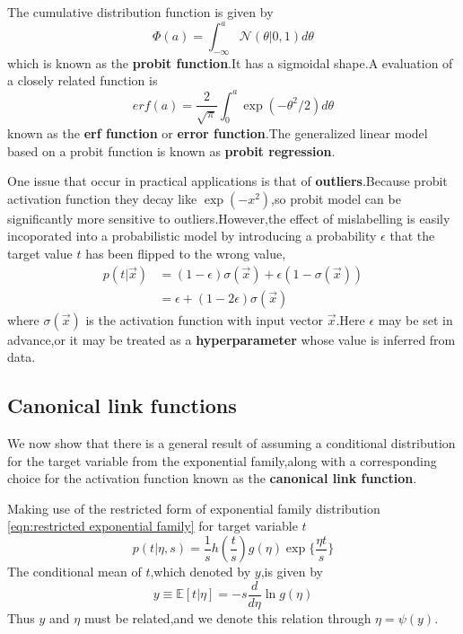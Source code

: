 The cumulative distribution function is given by
\begin{equation}
	\Phi(a) = \int_{-\infty}^{a}\mathcal{N}(\theta|0,1)d\theta
\end{equation}
which is known as the \textbf{probit function}.It has a sigmoidal shape.A evaluation of a closely related function is
\begin{equation}
erf(a) = \dfrac{2}{\sqrt{\pi}}\int_{0}^{a}\exp(-\theta^2/2)d\theta
\end{equation}
known as the \textbf{erf function} or \textbf{error function}.The generalized linear model based on a probit function is known as \textbf{probit regression}.

One issue that occur in practical applications is that of \textbf{outliers}.Because probit activation function they decay like $\exp(-x^2)$,so probit model can be significantly more sensitive to outliers.However,the effect of mislabelling is easily incoporated into a probabilistic model by introducing a probability $\epsilon$ that the target value $t$ has been flipped to the wrong value,
\begin{align}
p(t|\vec{x}) &= (1-\epsilon)\sigma(\vec{x})+\epsilon(1-\sigma(\vec{x}))\\
&=\epsilon + (1-2\epsilon)\sigma(\vec{x})
\end{align}
where $\sigma(\vec{x})$ is the activation function with input vector $\vec{x}$.Here $\epsilon$ may be set in advance,or it may be treated as a \textbf{hyperparameter} whose value is inferred from data.




\subsection{Canonical link functions}
We now show that there is a general result of assuming a conditional distribution for the target variable from the exponential family,along with a corresponding choice for the activation function known as the \textbf{canonical link function}.

Making use of the restricted form of exponential family distribution \ref{eqn:restricted exponential family} for target variable $t$
\begin{equation}
p(t|\eta,s)=\dfrac{1}{s}h(\dfrac{t}{s})g(\eta)\exp\{\dfrac{\eta t}{s}\}
\end{equation}
The conditional mean of $t$,which denoted by $y$,is given by 
\begin{equation}
y \equiv \mathbb{E}[t|\eta]=-s\dfrac{d}{d\eta}\ln g(\eta)
\end{equation}
Thus $y$ and $\eta$ must be related,and we denote this relation through $\eta = \psi(y)$.

